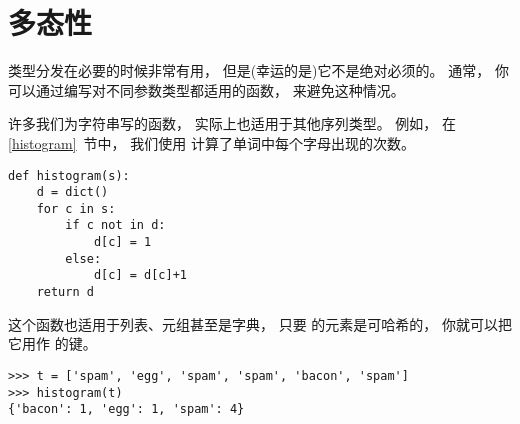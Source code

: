 \section{多态性}
\label{polymorphism}


类型分发在必要的时候非常有用， 但是(幸运的是)它不是绝对必须的。
通常， 你可以通过编写对不同参数类型都适用的函数， 来避免这种情况。

  


许多我们为字符串写的函数， 实际上也适用于其他序列类型。
例如， 在 \ref{histogram}~节中， 我们使用 
计算了单词中每个字母出现的次数。

\begin{lstlisting}
def histogram(s):
    d = dict()
    for c in s:
        if c not in d:
            d[c] = 1
        else:
            d[c] = d[c]+1
    return d
\end{lstlisting}

%

这个函数也适用于列表、元组甚至是字典， 只要  的元素是可哈希的， 你就可以把
它用作  的键。

\begin{lstlisting}
>>> t = ['spam', 'egg', 'spam', 'spam', 'bacon', 'spam']
>>> histogram(t)
{'bacon': 1, 'egg': 1, 'spam': 4}
\end{lstlisting}

%

